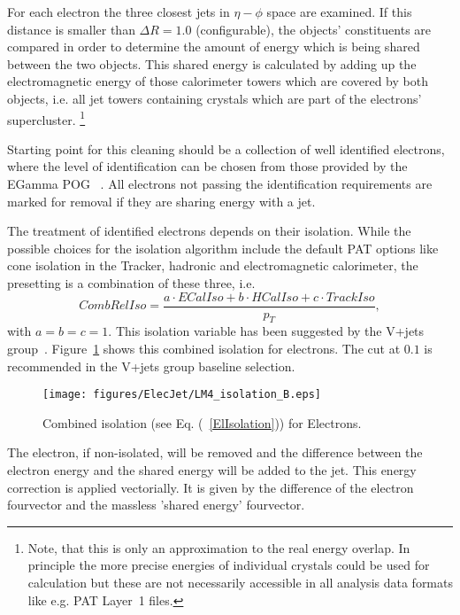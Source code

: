 \documentclass{cmspaper}
\begin{document}
For each electron the three closest jets in \( \eta-\phi\) space are
examined. If this distance is smaller than $\Delta R=1.0$ (configurable), the
objects' constituents are compared in order to determine the amount of energy
which is being shared between the two objects.
This shared energy is calculated by adding up the electromagnetic energy of
those calorimeter towers which are covered by both objects, i.e. all jet towers
containing crystals which are part of the electrons' supercluster.
\footnote{Note, that this is only an approximation to the real energy overlap.
In principle the more precise energies of individual crystals could be used for
calculation but these are not necessarily accessible in all analysis data
formats like e.g. PAT Layer~1 files.}

Starting point for this cleaning should be a collection of well identified
electrons, where the level of identification can be chosen from those provided
by the EGamma POG ~\cite{elecID}. All electrons not passing the identification
requirements are marked for removal if they are sharing energy with a jet.

The treatment of identified electrons depends on their isolation. While the
possible choices for the isolation algorithm include the default PAT options
like cone isolation in the Tracker, hadronic and electromagnetic calorimeter,
the presetting is a combination of these three, i.e. 
\begin{equation}
    CombRelIso=\frac{a\cdot ECalIso+b\cdot HCalIso+c\cdot TrackIso}{p_T},
    \label{ElIsolation}
\end{equation}
with \(a=b=c=1\). This isolation variable has been suggested by the V+jets
group~\cite{vplusjets}. Figure~\ref{fig:ElectronIsolation} shows this combined
isolation for electrons. The cut at \(0.1\) is recommended in the V+jets
group baseline selection.

\begin{figure}[hbt]
  \begin{center}
    \texttt{[image: figures/ElecJet/LM4\_isolation\_B.eps]}
    \caption{Combined isolation (see Eq. (~\ref{ElIsolation})) for Electrons.}
    \label{fig:ElectronIsolation}
  \end{center}
\end{figure}

The electron, if non-isolated, will be removed and the difference between
the electron energy and the shared energy will be added to the jet. This energy
correction is applied vectorially. It is given by the difference of the electron
fourvector and the massless 'shared energy' fourvector.
\end{document}
